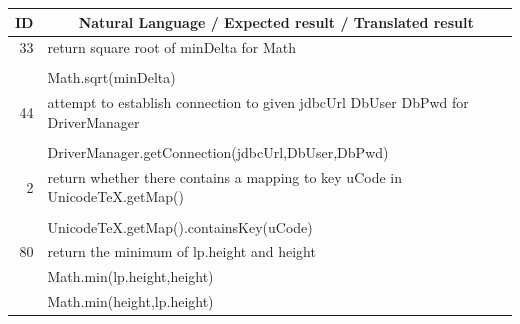 \documentclass[sigconf,review,anonymous]{article}
\begin{document}
\begin{table}[]
\centering
\begin{tabular}{|l|l|}
\hline
\multicolumn{1}{|c|}{\textbf{ID}} & \multicolumn{1}{c|}{\textbf{Natural Language / Expected result / Translated result}}        \\ \hline
\multicolumn{1}{|r|}{33}          & return square root of minDelta for Math                                                     \\ \hline
\rowcolor[HTML]{DAE8FC} 
                                  & \cellcolor[HTML]{DAE8FC}                                                                    \\ \cline{1-1}
\rowcolor[HTML]{DAE8FC} 
                                  & \multirow{-2}{*}{\cellcolor[HTML]{DAE8FC}Math.sqrt(minDelta)}                               \\ \hline
\multicolumn{1}{|r|}{44}          & attempt to establish connection to given jdbcUrl DbUser DbPwd for DriverManager             \\ \hline
\rowcolor[HTML]{DAE8FC} 
                                  & \cellcolor[HTML]{DAE8FC}                                                                    \\ \cline{1-1}
\rowcolor[HTML]{DAE8FC} 
                                  & \multirow{-2}{*}{\cellcolor[HTML]{DAE8FC}DriverManager.getConnection(jdbcUrl,DbUser,DbPwd)} \\ \hline
\multicolumn{1}{|r|}{2}           & return whether there contains a mapping to key uCode in UnicodeTeX.getMap()                 \\ \hline
\rowcolor[HTML]{DAE8FC} 
                                  & \cellcolor[HTML]{DAE8FC}                                                                    \\ \cline{1-1}
\rowcolor[HTML]{DAE8FC} 
                                  & \multirow{-2}{*}{\cellcolor[HTML]{DAE8FC}UnicodeTeX.getMap().containsKey(uCode)}            \\ \hline
\multicolumn{1}{|r|}{80}          & return the minimum of lp.height and height                                                  \\ \hline
\rowcolor[HTML]{FFCCC9} 
                                  & Math.min(lp.height,height)                                                                  \\ \hline
\rowcolor[HTML]{FFCCC9} 
                                  & Math.min(height,lp.height)                                                                  \\ \hline

\end{tabular}
\end{table}
\end{document}
